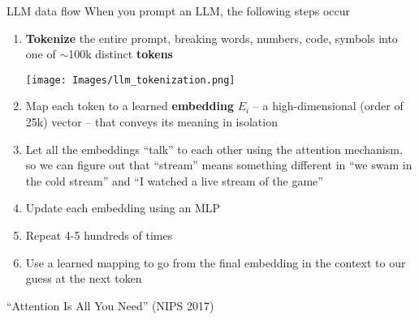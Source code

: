 \documentclass[xcolor=table, aspectratio=169]{beamer}
\newcommand{\alertbf}[1]{\alert{\textbf{#1}}}
\begin{document}
\begin{frame}{LLM data flow}
When you prompt an LLM, the following steps occur
\begin{enumerate}
    \item \alertbf{Tokenize} the entire prompt, breaking words, numbers, code, symbols into one of $\sim$100k distinct \alertbf{tokens}
    \begin{center}
        \texttt{[image: Images/llm\_tokenization.png]}
        \end{center}
    \item Map each token to a learned \alertbf{embedding} $E_i$ -- a high-dimensional (order of 25k) vector -- that conveys its meaning in isolation
    \item Let all the embeddings ``talk'' to each other using the attention mechanism, so we can figure out that ``stream'' means something different in ``we swam in the cold stream'' and ``I watched a live stream of the game''
    \item Update each embedding using an MLP
    \item Repeat 4-5 hundreds of times
    \item Use a learned mapping to go from the final embedding in the context to our guess at the next token
\end{enumerate}
\end{frame}

\begin{frame}{``Attention Is All You Need'' (NIPS 2017)}
\end{frame}
\end{document}
